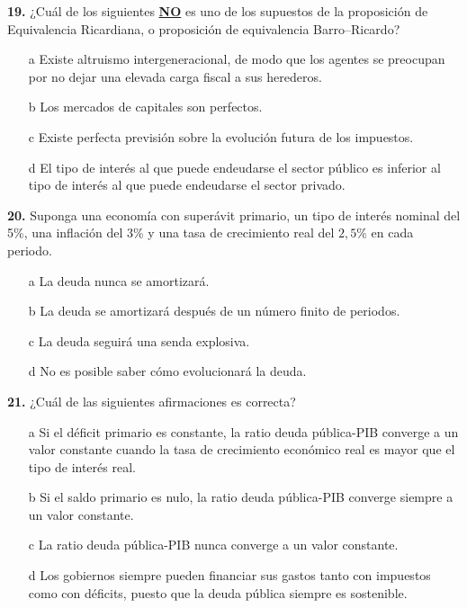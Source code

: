 \documentclass{nuevotema}
\begin{document}
\preguntas


\textbf{19.} ¿Cuál de los siguientes \textbf{\underline{NO}} es uno de los supuestos de la proposición de Equivalencia Ricardiana, o proposición de equivalencia Barro--Ricardo?

\begin{itemize}
	\item[a] Existe altruismo intergeneracional, de modo que los agentes se preocupan por no dejar una elevada carga fiscal a sus herederos.
	\item[b] Los mercados de capitales son perfectos.
	\item[c] Existe perfecta previsión sobre la evolución futura de los impuestos.
	\item[d] El tipo de interés al que puede endeudarse el sector público es inferior al tipo de interés al que puede endeudarse el sector privado.
\end{itemize}

\bigskip
\textbf{20.} Suponga una economía con superávit primario, un tipo de interés nominal del 5\%, una inflación del 3\% y una tasa de crecimiento real del $2,5\%$ en cada periodo. 

\begin{itemize}
	\item[a] La deuda nunca se amortizará.
	\item[b] La deuda se amortizará después de un número finito de periodos.
	\item[c] La deuda seguirá una senda explosiva.
	\item[d] No es posible saber cómo evolucionará la deuda.
\end{itemize}


\textbf{21.} ¿Cuál de las siguientes afirmaciones es correcta?

\begin{itemize}
	\item[a] Si el déficit primario es constante, la ratio deuda pública-PIB converge a un valor constante cuando la tasa de crecimiento económico real es mayor que el tipo de interés real.
	\item[b] Si el saldo primario es nulo, la ratio deuda pública-PIB converge siempre a un valor constante.
	\item[c] La ratio deuda pública-PIB nunca converge a un valor constante.
	\item[d] Los gobiernos siempre pueden financiar sus gastos tanto con impuestos como con déficits, puesto que la deuda pública siempre es sostenible.
\end{itemize}
\end{document}
